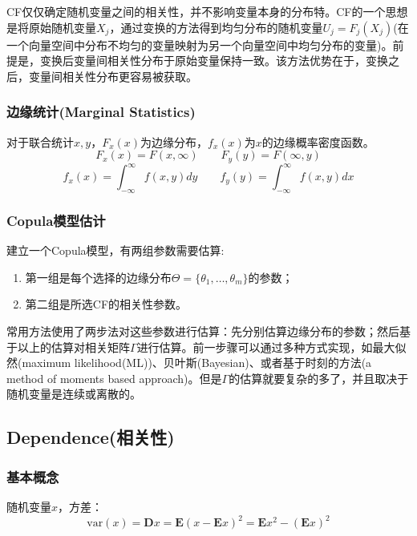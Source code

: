 CF仅仅确定随机变量之间的相关性，并不影响变量本身的分布特。CF的一个思想是将原始随机变量$X_j$，通过变换的方法得到均匀分布的随机变量$U_j = F_j(X_j)$(在一个向量空间中分布不均匀的变量映射为另一个向量空间中均匀分布的变量)。前提是，变换后变量间相关性分布于原始变量保持一致。该方法优势在于，变换之后，变量间相关性分布更容易被获取。


\subsubsection{边缘统计(Marginal Statistics)}
对于联合统计$x,y$，$F_x(x)$为边缘分布，$f_x(x)$为$x$的边缘概率密度函数。
\begin{equation}
    F_x(x) = F(x,\infty) \qquad F_y(y) = F(\infty,y)
    \label{eq0.1}
\end{equation}
\begin{equation}
    f_x(x) = \int_{-\infty}^{\infty} f(x,y) dy \qquad f_y(y) = \int_{-\infty}^{\infty} f(x,y) dx
    \label{eq0.2}
\end{equation}
\subsubsection{Copula模型估计}
建立一个Copula模型，有两组参数需要估算\cite{Smith2009}:
\begin{enumerate}
    \item 第一组是每个选择的边缘分布$\Theta = \{\theta_1,\dots,\theta_m\}$的参数；
    \item 第二组是所选CF的相关性参数。
\end{enumerate}
常用方法使用了两步法对这些参数进行估算：先分别估算边缘分布的参数；然后基于以上的估算对相关矩阵$\Gamma$进行估算。前一步骤可以通过多种方式实现，如最大似然(maximum likelihood(ML))、贝叶斯(Bayesian)、或者基于时刻的方法(a method of moments based approach)。但是$\Gamma$的估算就要复杂的多了，并且取决于随机变量是连续或离散的。

\subsection{Dependence(相关性)}
\subsubsection{基本概念}
随机变量$x$，方差：
\begin{equation}
    \text{var}(x) = \mathbf{D}x = \mathbf{E}(x-\mathbf{E}x)^2 = \mathbf{E}x^2-(\mathbf{E}x)^2
    \label{eq-var}
\end{equation}

